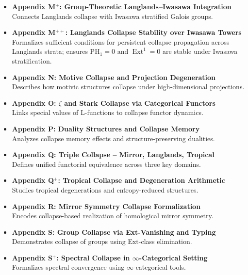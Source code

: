 \documentclass[11pt]{article}
\DeclareMathOperator{\Ext}{Ext}
\begin{document}
\begin{itemize}
  \item \textbf{Appendix M$^+$: Group-Theoretic Langlands–Iwasawa Integration} \\
  Connects Langlands collapse with Iwasawa stratified Galois groups.

  \item \textbf{Appendix M$^{++}$: Langlands Collapse Stability over Iwasawa Towers} \\
  Formalizes sufficient conditions for persistent collapse propagation across Langlands strata; ensures PH$_1 = 0$ and $\Ext^1 = 0$ are stable under Iwasawa stratification.

  \item \textbf{Appendix N: Motive Collapse and Projection Degeneration} \\
  Describes how motivic structures collapse under high-dimensional projections.

  \item \textbf{Appendix O: $\zeta$ and Stark Collapse via Categorical Functors} \\
  Links special values of L-functions to collapse functor dynamics.

  \item \textbf{Appendix P: Duality Structures and Collapse Memory} \\
  Analyzes collapse memory effects and structure-preserving dualities.

  \item \textbf{Appendix Q: Triple Collapse – Mirror, Langlands, Tropical} \\
  Defines unified functorial equivalence across three key domains.

  \item \textbf{Appendix Q$^+$: Tropical Collapse and Degeneration Arithmetic} \\
  Studies tropical degenerations and entropy-reduced structures.

  \item \textbf{Appendix R: Mirror Symmetry Collapse Formalization} \\
  Encodes collapse-based realization of homological mirror symmetry.

  \item \textbf{Appendix S: Group Collapse via Ext-Vanishing and Typing} \\
  Demonstrates collapse of groups using Ext-class elimination.

  \item \textbf{Appendix S$^+$: Spectral Collapse in $\infty$-Categorical Setting} \\
  Formalizes spectral convergence using $\infty$-categorical tools.


\end{itemize}
\end{document}
